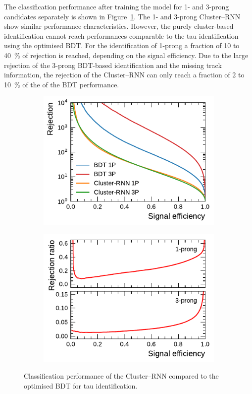 The classification performance after training the model for 1- and 3-prong
\tauhadvis candidates separately is shown in
Figure~\ref{fig:cluster_rnn_roc_ratios}. The 1- and 3-prong Cluster--RNN show
similar performance characteristics. However, the purely cluster-based
identification cannot reach performances comparable to the tau identification
using the optimised BDT. For the identification of 1-prong \tauhadvis a fraction
of \num{10} to \SI{40}{\percent} of rejection is reached, depending on the
signal efficiency. Due to the large rejection of the 3-prong BDT-based
identification and the missing track information, the rejection of the
Cluster--RNN can only reach a fraction of \num{2} to \SI{10}{\percent} of the of
the BDT performance.

\begin{figure}[htb]
  \begin{subfigure}[t]{0.48\textwidth}
    \centering
    \includegraphics{./figures/rnn/cluster/roc.pdf}
  \end{subfigure}\hfill
  \begin{subfigure}[t]{0.48\textwidth}
    \centering
    \includegraphics{./figures/rnn/cluster/ratios.pdf}
  \end{subfigure}
  \caption{Classification performance of the Cluster--RNN compared to the
    optimised BDT for tau identification.}
  \label{fig:cluster_rnn_roc_ratios}
\end{figure}

